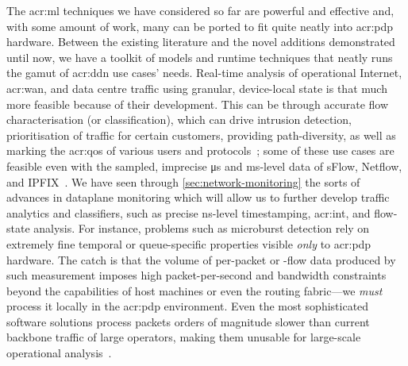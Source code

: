 %

The \gls{acr:ml} techniques we have considered so far are powerful and effective and, with some amount of work, many can be ported to fit quite neatly into \gls{acr:pdp} hardware.
Between the existing literature and the novel additions demonstrated until now, we have a toolkit of models and runtime techniques that neatly runs the gamut of \gls{acr:ddn} use cases' needs.
Real-time analysis of operational Internet, \gls{acr:wan}, and data centre traffic using granular, device-local state is that much more feasible because of their development.
This can be through accurate flow characterisation (or classification), which can drive intrusion detection, prioritisation of traffic for certain customers, providing path-diversity, as well as marking the \gls{acr:qos} of various users and protocols~\parencite{DBLP:journals/ccr/BernailleTASS06,DBLP:conf/lisa/Roesch99}; some of these use cases are feasible even with the sampled, imprecise \unit{\micro\second} and \unit{\milli\second}-level data of sFlow, Netflow, and IPFIX~\parencite{rfc7011,rfc3954}.
We have seen through \cref{sec:network-monitoring} the sorts of advances in dataplane monitoring which will allow us to further develop traffic analytics and classifiers, such as precise \unit{\nano\second}-level timestamping, \gls{acr:int}, and flow-state analysis.
For instance, problems such as microburst detection rely on extremely fine temporal or queue-specific properties visible \emph{only} to \gls{acr:pdp} hardware.
The catch is that the volume of per-packet or -flow data produced by such measurement imposes high packet-per-second and bandwidth constraints beyond the capabilities of host machines or even the routing fabric---we \emph{must} process it locally in the \gls{acr:pdp} environment.
Even the most sophisticated software solutions process packets orders of magnitude slower than current backbone traffic of large operators, making them unusable for large-scale operational analysis~\parencite{DBLP:journals/wpc/ParkA17}.

